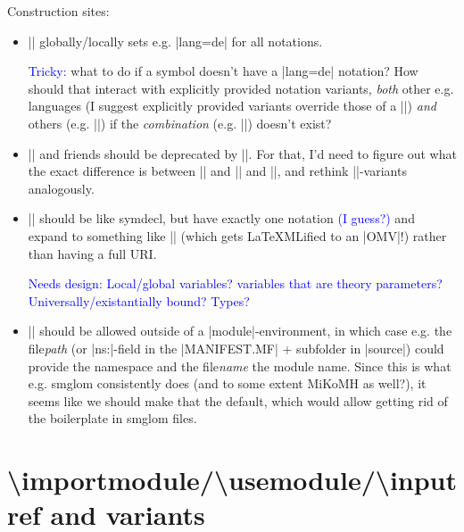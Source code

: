\documentclass{bluenote}
\def\designquestion#1{\textcolor{blue}{#1}}
\begin{document}
Construction sites:
\begin{itemize}
  \item |\setnotation[key=value]| globally/locally sets e.g. |lang=de| for all notations.
    
    \designquestion{Tricky:} what to do if a symbol doesn't have a |lang=de| notation?
    How should that interact with explicitly provided notation variants, \emph{both}
    other e.g. languages (I suggest explicitly provided variants override those of a
    |\setnotation|) \emph{and} others (e.g. |\foo[variant=op]|) if the \emph{combination}
    (e.g. |\foo[variant=op,lang=de]|) doesn't exist?

  \item |\symi| and friends should be deprecated by
    |\symdecl|. For that, I'd need to figure
    out what the exact difference is between || and || and ||,
    and rethink |\trefi|-variants analogously.
  \item |\vardecl| should be like symdecl, but have exactly one notation 
    \designquestion{(I guess?)}
    and expand to something like || (which gets LaTeXMLified to an |OMV|!)
    rather than having a full URI.

    \designquestion{Needs design: Local/global variables? variables that are theory parameters?
    Universally/existantially bound? Types?}

  \item |\symdecl| should be allowed outside of a |module|-environment, in which case
    e.g. the file\emph{path} (or |ns:|-field in the |MANIFEST.MF| + subfolder in |source|)
    could provide the namespace and the file\emph{name} the module name.
    Since this is what e.g. smglom consistently does (and to some extent MiKoMH as well?),
    it seems like we should make that the default, which would allow getting rid of the
    boilerplate in smglom files.
\end{itemize}

\section{\textbackslash importmodule/\textbackslash usemodule/\textbackslash inputref and variants}
\end{document}
